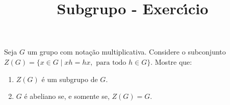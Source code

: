\documentclass{beamer}
\title{Subgrupo - Exerc{\'\i}cio}
\author[\autor]{\autor}
\institute[\instituto]{\instituto}
\date{}
\begin{document}


    \begin{frame}
        \begin{exercicio}
            Seja $G$ um grupo com nota\c{c}\~ao multiplicativa. Considere o subconjunto $Z(G) = \{x \in G \mid xh = hx, \mbox{ para todo } h \in G\}$. Mostre que:

            \vspace{.4cm}

            \begin{enumerate}[label=({\alph*})]
              \item $Z(G)$ \'e um subgrupo de $G$.

              \vspace{.4cm}

              \item $G$ \'e abeliano se, e somente se, $Z(G) = G$.

              \vspace{.4cm}

            \end{enumerate}
        \end{exercicio}
    \end{frame}
\end{document}
